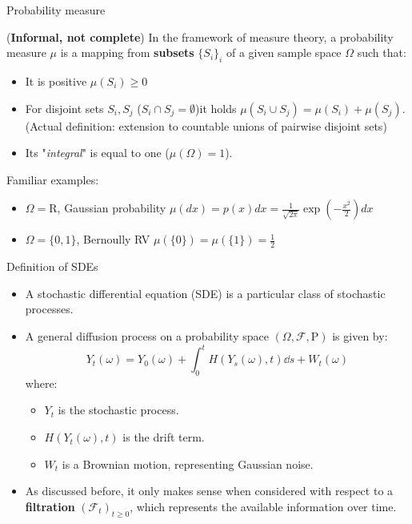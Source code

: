 \begin{frame}{Probability measure}

({\color{red}\textbf{Informal, not complete}}) In the framework of measure theory, a probability measure $\mu$ is a mapping from \textbf{subsets} $\{S_i\}_i$ of a given sample space $\Omega$ such that:
\begin{itemize}
    \item It is positive $\mu(S_i)\geq 0$
    \item For disjoint sets $S_i,S_j$ ($S_i\cap S_j=\emptyset$)it holds $\mu(S_i\cup S_j)=\mu(S_i)+\mu( S_j)$. (Actual definition: extension to countable unions of pairwise disjoint sets)
    \item Its "\textit{integral}" is equal to one ($\mu(\Omega)=1$).
\end{itemize}

Familiar examples:
\begin{itemize}
    \item $\Omega=\mathrm{R}$, Gaussian probability $\mu(dx)=p(x)dx=\frac{1}{\sqrt{2\pi}}\exp(-\frac{x^2}{2})dx$
    \item $\Omega=\{0,1\}$, Bernoully RV $\mu(\{0\})=\mu(\{1\})=\frac{1}{2}$
\end{itemize}
    
\end{frame}
\begin{frame}[allowframebreaks]{Definition of SDEs}
  
  \begin{itemize}
    \item A stochastic differential equation (SDE) is a particular class of stochastic processes.
\item A general diffusion process on a probability space $(\Omega, \mathcal{F}, \mathrm{P})$ is given by:
  \begin{equation}
      Y_t(\omega) = Y_0(\omega) + \int_0^t H(Y_s(\omega),t)\dd s + W_t(\omega)
  \end{equation}
  where:
  \begin{itemize}
    \item $Y_t$ is the stochastic process.
    \item $H(Y_t(\omega),t)$ is the drift term.
    \item $W_t$ is a Brownian motion, representing Gaussian noise.
  \end{itemize}
      \item As discussed before, it only makes sense when considered with respect to a \textbf{filtration} $(\mathcal{F}_t)_{t \geq 0}$, which represents the available information over time.
  \end{itemize}

  
\end{frame}


